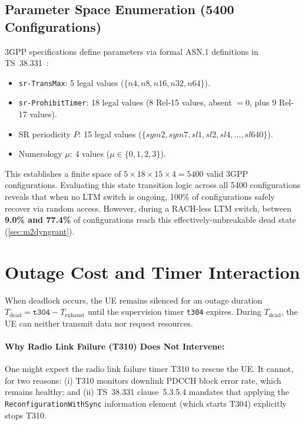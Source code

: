 \subsection{Parameter Space Enumeration (5400 Configurations)}
\label{sec:m2space}
3GPP specifications define parameters via formal ASN.1 definitions in TS~38.331~\cite{3gpp38331}:
\begin{itemize}\itemsep1pt
  \item \texttt{sr-TransMax}: 5 legal values ($\{n4, n8, n16, n32, n64\}$).
  \item \texttt{sr-ProhibitTimer}: 18 legal values (8 Rel-15 values, absent $=0$, plus 9 Rel-17 values).
  \item SR periodicity $P$: 15 legal values ($\{sym2, sym7, sl1, sl2, sl4, \dots, sl640\}$).
  \item Numerology $\mu$: 4 values ($\mu \in \{0, 1, 2, 3\}$).
\end{itemize}
This establishes a finite space of $5 \times 18 \times 15 \times 4 = 5400$ valid 3GPP configurations.
Evaluating this state transition logic across all 5400 configurations reveals that when no LTM switch is ongoing, 100\%
of configurations safely recover via random access. However, during a RACH-less LTM switch, between
\textbf{9.0\% and 77.4\%} of configurations reach this effectively-unbreakable dead state (\cref{sec:m2dyngrant}).

\section{Outage Cost and Timer Interaction}
\label{sec:m2cost}

When deadlock occurs, the UE remains silenced for an outage duration
$T_{\text{dead}} = \texttt{t304} - T_{\text{exhaust}}$ until the supervision timer \texttt{t304} expires.
During $T_{\text{dead}}$, the UE can neither transmit data nor request resources.

\paragraph{Why Radio Link Failure (T310) Does Not Intervene:} One might expect the radio link failure
timer T310 to rescue the UE. It cannot, for two reasons: (i) T310 monitors downlink PDCCH block
error rate, which remains healthy; and (ii) TS~38.331 clause~5.3.5.4 mandates that applying the
\texttt{ReconfigurationWithSync} information element (which starts T304) explicitly stops T310.


